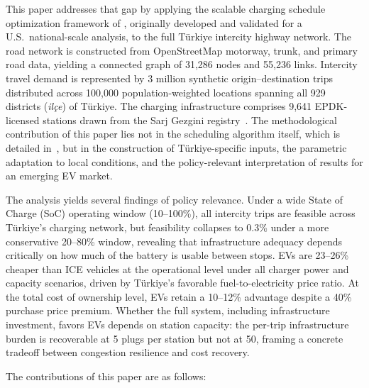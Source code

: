 This paper addresses that gap by applying the scalable charging schedule optimization framework of \citet{cokyasar2026electrification}, originally developed and validated for a U.S.\ national-scale analysis, to the full T\"{u}rkiye intercity highway network. The road network is constructed from OpenStreetMap motorway, trunk, and primary road data, yielding a connected graph of 31,286 nodes and 55,236 links. Intercity travel demand is represented by 3 million synthetic origin--destination trips distributed across 100,000 population-weighted locations spanning all 929 districts (\textit{il\c{c}e}) of T\"{u}rkiye. The charging infrastructure comprises 9,641 EPDK-licensed stations drawn from the Sarj Gezgini registry~\cite{sarjgezgini_2025}. The methodological contribution of this paper lies not in the scheduling algorithm itself, which is detailed in~\cite{cokyasar2026electrification}, but in the construction of T\"{u}rkiye-specific inputs, the parametric adaptation to local conditions, and the policy-relevant interpretation of results for an emerging EV market.

The analysis yields several findings of policy relevance. Under a wide State of Charge (SoC) operating window (10--100\%), all intercity trips are feasible across T\"{u}rkiye's charging network, but feasibility collapses to 0.3\% under a more conservative 20--80\% window, revealing that infrastructure adequacy depends critically on how much of the battery is usable between stops. EVs are 23--26\% cheaper than ICE vehicles at the operational level under all charger power and capacity scenarios, driven by T\"{u}rkiye's favorable fuel-to-electricity price ratio. At the total cost of ownership level, EVs retain a 10--12\% advantage despite a 40\% purchase price premium. Whether the full system, including infrastructure investment, favors EVs depends on station capacity: the per-trip infrastructure burden is recoverable at 5 plugs per station but not at 50, framing a concrete tradeoff between congestion resilience and cost recovery.

The contributions of this paper are as follows:

